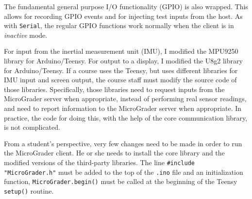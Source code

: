 \documentclass[12pt]{article}
\begin{document}
\begin{appendices}
The fundamental general purpose I/O functionality (GPIO) is also wrapped.  This allows for recording GPIO events and for injecting test inputs from the host.  As with \texttt{Serial}, the regular GPIO functions work normally when the client is in \textit{inactive} mode. 

For input from the inertial measurement unit (IMU), I modified the MPU9250 \cite{MPU9250} library for Arduino/Teensy.  For output to a display, I modified the U8g2 \cite{u8g2} library for Arduino/Teensy.  If a course uses the Teensy, but uses different libraries for IMU input and screen output, the course staff must modify the source code of those libraries.  Specifically, those libraries need to request inputs from the MicroGrader server when appropriate, instead of performing real sensor readings, and need to report information to the MicroGrader server when appropriate.  In practice, the code for doing this, with the help of the core communication library, is not complicated.

From a student's perspective, very few changes need to be made in order to run the MicroGrader client.  He or she needs to install the core library and the modified versions of the third-party libraries.  The line \verb+#include "MicroGrader.h"+ must be added to the top of the \texttt{.ino} file and an initialization function, \texttt{MicroGrader.begin()} must be called at the beginning of the Teensy \texttt{setup()} routine.

\end{appendices}
\end{document}
